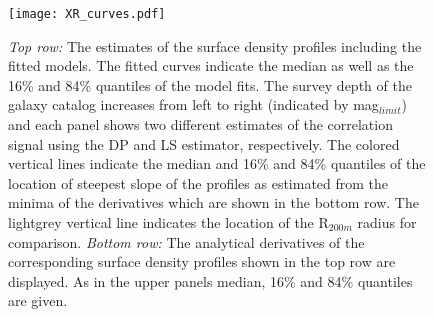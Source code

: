 \documentclass[a4paper,fleqn,usenatbib]{mnras}
\begin{document}
\begin{figure}
    \texttt{[image: XR\_curves.pdf]}
\caption{\textit{Top row: }The estimates of the surface density profiles including the fitted models. The fitted curves indicate the median as well as the 16\% and 84\% quantiles of the model fits. The survey depth of the galaxy catalog increases from left to right (indicated by mag$_{limit}$) and each panel shows two different estimates of the correlation signal using the DP and LS estimator, respectively. The colored vertical lines indicate the median and 16\% and 84\% quantiles of the location of steepest slope of the profiles as estimated from the minima of the derivatives which are shown in the bottom row. The lightgrey vertical line indicates the location of the R$_{200m}$ radius for comparison. \textit{Bottom row: } The analytical derivatives of the corresponding surface density profiles shown in the top row are displayed. As in the upper panels median, 16\% and 84\% quantiles are given.}
   \label{fig:XR_graphs}
\end{figure}
\end{document}

